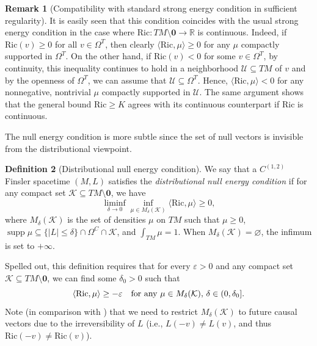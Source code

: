 \documentclass[a4paper,11pt]{article}
\numberwithin{equation}{section}
\theoremstyle{definition}
\newtheorem{Definition}{Definition}[section]
\newtheorem{Remark}[Definition]{Remark}
\theoremstyle{plain}
\newcommand{\R}{\mathbb R}
\newcommand{\eps}{\varepsilon}
\newcommand{\Ric}{\mathrm{Ric}}
\DeclareMathOperator{\supp}{supp}
\begin{document}
\begin{Remark}[Compatibility with standard strong energy condition in sufficient regularity]
    It is easily seen that this condition coincides with the usual strong energy condition in the case where $\Ric : TM \setminus \mathbf{0} \rightarrow \R$ is continuous.
    Indeed, if $\Ric(v) \geq 0$ for all $v \in \Omega^T$, then clearly $\langle \Ric, \mu \rangle \geq 0$ for any $\mu$ compactly supported in $\Omega^T$.
    On the other hand, if $\Ric(v)<0$ for some $v \in \Omega^T$, by continuity, this inequality continues to hold in a neighborhood $\mathcal{U} \subseteq TM$ of $v$ and by the openness of $\Omega^T$, we can assume that $\mathcal{U} \subseteq \Omega^T$.
    Hence, $\langle \Ric, \mu \rangle <0$ for any nonnegative, nontrivial $\mu$ compactly supported in $\mathcal{U}$. 
    The same argument shows that the general bound $\Ric \geq K$ agrees with its continuous counterpart if $\Ric$ is continuous.
\end{Remark}


The null energy condition is more subtle since the set of null vectors is invisible from the distributional viewpoint.

\begin{Definition}[Distributional null energy condition]
\label{Definition: null energy condition}
    We say that a $C^{(1,2)}$ Finsler spacetime $(M,L)$ satisfies the \textit{distributional null energy condition} if for any compact set $\mathcal{K} \subseteq TM \setminus \mathbf{0}$, we have
    \begin{equation*}
        \liminf_{\delta \to 0} \inf_{\mu \in M_\delta(\mathcal{K})} \langle \Ric, \mu\rangle \geq 0,
    \end{equation*}
    where $M_\delta(\mathcal{K})$ is the set of densities $\mu$ on $TM$ such that $\mu \geq 0$, $\supp \mu \subseteq \{|L| \leq \delta \} \cap \Omega^C \cap \mathcal{K}$, and $\int_{TM} \mu = 1$. 
    When $M_\delta(\mathcal{K}) = \varnothing$, the infimum is set to $+ \infty$.
\end{Definition}

Spelled out, this definition requires that for every $\eps >0$ and any compact set $\mathcal{K} \subseteq TM \setminus \mathbf{0}$, we can find some $\delta_0>0$ such that
    \begin{equation*}
            \langle \Ric, \mu \rangle \geq - \eps \quad \textnormal{for any } \mu \in M_\delta(\mathcal{K}),\, \delta \in (0,\delta_0].
    \end{equation*}
Note (in comparison with \cite{KOSS}) that we need to restrict $M_\delta(\mathcal{K})$ to future causal vectors due to the irreversibility of $L$ (i.e., $L(-v) \neq L(v)$, and thus $\Ric(-v) \neq \Ric(v)$).
\end{document}
